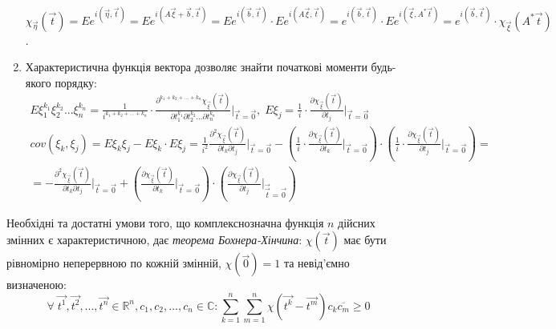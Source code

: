 \begin{enumerate}
    $\chi_{\vec{\eta}}(\vec{t}) = E e^{i(\vec{\eta}, \vec{t})} = E e^{i(A\vec{\xi} + \vec{b}, \vec{t})}=
    E e^{i(\vec{b}, \vec{t})} \cdot E e^{i(A\vec{\xi}, \vec{t})} = e^{i(\vec{b}, \vec{t})} \cdot E e^{i(\vec{\xi}, A^{*}\vec{t})} = e^{i(\vec{b}, \vec{t})} \cdot \chi_{\vec{\xi}}(A^{*}\vec{t})$.
    \item Характеристична функція вектора дозволяє знайти початкові моменти будь-якого порядку:
    \begin{gather*}
        E\xi_1^{k_1} \xi_2^{k_2} ... \xi_n^{k_n} = \frac{1}{i^{k_1 + k_2 + ... + k_n}} \cdot \frac{\partial^{k_1 + k_2 + ... + k_n}\chi_{\vec{\xi}}(\vec{t})}{\partial t_1^{k_1} \partial t_2^{k_2} ... \partial t_n^{k_n}} \Biggr \vert_{\vec{t} = \vec{0}}, 
        \; E\xi_j = \frac{1}{i} \cdot\frac{\partial \chi_{\vec{\xi}}(\vec{t})}{\partial t_j} \Biggr \vert_{\vec{t} = \vec{0}} \\
        {cov}(\xi_k, \xi_j) = E\xi_k\xi_j - E\xi_k\cdot E\xi_j = \frac{1}{i^2} \frac{\partial^2 \chi_{\vec{\xi}}(\vec{t})}{\partial t_k \partial t_j} \Biggr \vert_{\vec{t} = \vec{0}} - 
        \left( \frac{1}{i} \cdot\frac{\partial \chi_{\vec{\xi}}(\vec{t})}{\partial t_k} \Biggr \vert_{\vec{t} = \vec{0}}\right) \cdot \left( \frac{1}{i} \cdot\frac{\partial \chi_{\vec{\xi}}(\vec{t})}{\partial t_j} \Biggr \vert_{\vec{t} = \vec{0}}\right) = \\
        = -\frac{\partial^2 \chi_{\vec{\xi}}(\vec{t})}{\partial t_k \partial t_j} \Biggr \vert_{\vec{t} = \vec{0}} + 
        \left(\frac{\partial \chi_{\vec{\xi}}(\vec{t})}{\partial t_k} \Biggr \vert_{\vec{t} = \vec{0}}\right) \cdot \left(\frac{\partial \chi_{\vec{\xi}}(\vec{t})}{\partial t_j} \Biggr \vert_{\vec{\vec{t}} = \vec{0}}\right)\end{gather*}
\end{enumerate}

Необхідні та достатні умови того, що комплекснозначна функція $n$ дійсних змінних є характеристичною, дає
\emph{теорема Бохнера-Хінчина}: $\chi(\vec{t})$ має бути рівномірно неперервною по кожній змінній, $\chi(\vec{0}) = 1$ та 
невід'ємно визначеною: $$
    \forall \; \vec{t^1}, \vec{t^2}, ..., \vec{t^n} \in \mathbb{R}^n, c_1, c_2, ..., c_n \in \mathbb{C}: 
    \sum\limits_{k=1}^n {\sum\limits_{m=1}^n \chi(\vec{t^k} - \vec{t^m}) c_k \overline{c_m}} \geq 0$$